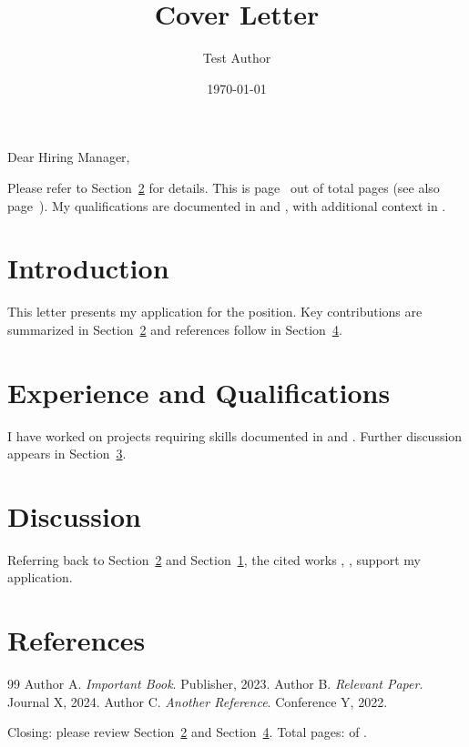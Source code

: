 \documentclass[11pt,a4paper]{article}
\title{Cover Letter}
\author{Test Author}
\date{\today}
\begin{document}
\maketitle

Dear Hiring Manager,

Please refer to Section~\ref{sec:experience} for details. This is page \thepage\ out of total \pageref{LastPage} pages (see also page~\pageref{sec:refs}).
My qualifications are documented in \cite{ref1} and \cite{ref2}, with additional context in \cite{ref3}.

\section{Introduction}
\label{sec:intro}
This letter presents my application for the position. Key contributions are summarized in Section~\ref{sec:experience} and references follow in Section~\ref{sec:refs}.

\section{Experience and Qualifications}
\label{sec:experience}
I have worked on projects requiring skills documented in \cite{ref1} and \cite{ref2}.
Further discussion appears in Section~\ref{sec:discussion}.

\section{Discussion}
\label{sec:discussion}
Referring back to Section~\ref{sec:experience} and Section~\ref{sec:intro}, the cited works \cite{ref1}, \cite{ref2}, \cite{ref3} support my application.

\section{References}
\label{sec:refs}
\begin{thebibliography}{99}
 Author A. \emph{Important Book}. Publisher, 2023.
 Author B. \emph{Relevant Paper}. Journal X, 2024.
 Author C. \emph{Another Reference}. Conference Y, 2022.
\end{thebibliography}

Closing: please review Section~\ref{sec:experience} and Section~\ref{sec:refs}.
Total pages: \pageref{LastPage} of \pageref{LastPage}.
\end{document}
